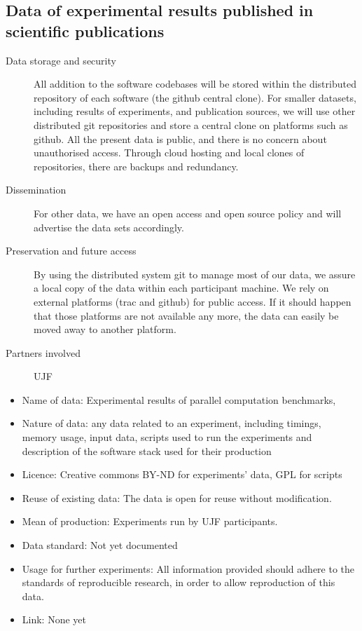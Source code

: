 \documentclass[12pt]{article}
\begin{document}
\begin{enumerate}
\subsection{Data of experimental results published in scientific publications}

\begin{description}
\item[Data storage and security] All addition to the software codebases will be
  stored within the distributed repository of each software (the github central
  clone). For smaller datasets, including results of experiments, and publication
  sources, we will use other distributed git repositories and store a central clone on
  platforms such as github. All the present data is public, and there is no
  concern about unauthorised access. Through cloud hosting and local clones of
repositories, there are backups and redundancy.
\item[Dissemination] For other data, we have an open access and open source policy and will advertise the data sets accordingly.
\item[Preservation and future access] By using the distributed system git to manage most of our data, we assure a local copy of the data within each participant machine. We rely on external platforms (trac and github) for public access. If it should happen that those platforms are not available any more, the data can easily be moved away to another platform.
\item[Partners involved] UJF
\end{description}

\begin{itemize}
\item{Name of data:} Experimental results of parallel computation benchmarks,
\item{Nature of data:} any data related to an experiment, including timings,
  memory usage, input data, scripts used to run the experiments and description
  of the software stack used for their production
\item{Licence:} Creative commons BY-ND for experiments' data, GPL for scripts
\item{Reuse of existing data:} The data is open for reuse without modification.
\item{Mean of production:} Experiments run by UJF participants.
\item{Data standard:} Not yet documented
\item{Usage for further experiments:} All information provided should adhere to
  the standards of reproducible research, in order to allow reproduction of
  this data.
\item{Link:} None yet
\end{itemize}



\end{enumerate}
\end{document}
